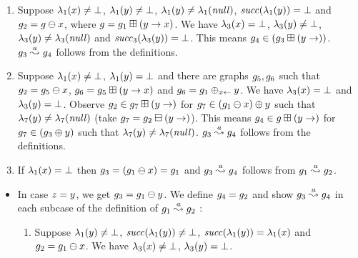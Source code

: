 {\begin{enumerate}
\begin{enumerate}
\begin{itemize}
\begin{enumerate}
    \item Suppose $\lambda_1(x)\neq\bot$, 
      $\lambda_1(y)\neq\bot$, 
      $\lambda_1(y)\neq\lambda_1({\it null})$, 
      ${\it succ}(\lambda_1(y))=\bot$ and
      $g_2=g\ominus{\ensuremath{x}}$, where
      $g=g_1\boxplus({y}\rightarrow{\ensuremath{x}})$.
      We have $\lambda_3(x)=\bot$, 
      $\lambda_3(y)\neq\bot$, 
      $\lambda_3(y)\neq\lambda_3({\it null})$ and  
      ${\it succ}_3(\lambda_3(y))=\bot$.
      This means $g_4\in(g_3\boxplus({y}\rightarrow))$.
      $g_3\stackrel{a}{\leadsto}g_4$ follows from the definitions.
    \item Suppose $\lambda_1(x)\neq\bot$, %
      $\lambda_1(y)=\bot$ %
      and there are graphs $g_5,g_6$ such that
      $g_2=g_5\ominus{\ensuremath{x}}$, %
      $g_6=g_5\boxplus({y}\rightarrow{\ensuremath{x}})$ and %
      $g_6=g_1\oplus_{{x}\leftarrow}{y}$.
      We have $\lambda_3(x)=\bot$ and 
      $\lambda_3(y)=\bot$.
      Observe $g_2\in g_7\boxplus({y}\rightarrow)$ for
      $g_7\in(g_1\ominus{\ensuremath{x}})\oplus{\ensuremath{y}}$
      such that $\lambda_7(y)\neq\lambda_7({\it null})$ 
      (take $g_7=g_2\boxminus({y}\rightarrow)$).
      This means $g_4\in g\boxplus({y}\rightarrow)$
      for $g_7\in(g_3\oplus{\ensuremath{y}})$
      such that $\lambda_7(y)\neq\lambda_7({\it null})$.
      $g_3\stackrel{a}{\leadsto}g_4$ follows from the definitions.    
    \item If $\lambda_1(x)=\bot$ then 
      $g_3=(g_1\ominus{\ensuremath{x}})=g_1$ and 
      $g_3\stackrel{a}{\leadsto}g_4$
      follows from $g_1\stackrel{a}{\leadsto}g_2$.
    \end{enumerate}
  \end{itemize}
%
  \begin{itemize}
  \item In case $z=y$, we get $g_3=g_1\ominus{\ensuremath{y}}$.
    We define $g_4=g_2$ and show 
    $g_3\stackrel{a}{\leadsto}g_4$ in each subcase of the definition of
    $g_1\stackrel{a}{\leadsto}g_2$ :  
    \begin{enumerate}
    \item Suppose $\lambda_1(y)\neq\bot$, %
      ${\it succ}(\lambda_1(y))\neq\bot$, %
      ${\it succ}(\lambda_1(y))=\lambda_1(x)$ and
      $g_2=g_1\ominus{\ensuremath{x}}$. 
      We have   $\lambda_3(x)\neq\bot$, %
      $\lambda_3(y)=\bot$.

\end{enumerate}
\end{itemize}
\end{enumerate}
\end{enumerate}}
